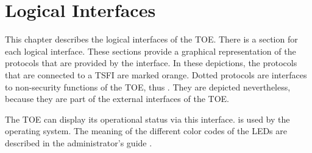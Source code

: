 \chapter{Logical Interfaces}\hypertarget{tsfi.ls}{\label{tsfi.ls}}

This chapter describes the logical interfaces of the TOE. There is a section for
each logical interface. These sections provide a graphical representation of the
protocols that are provided by the interface. In these depictions, the protocols
that are connected to a TSFI are marked orange. Dotted protocols are interfaces
to non-security functions of the TOE, thus . They are depicted
nevertheless, because they are part of the external interfaces of the TOE.

\clearpage



\clearpage



\clearpage



The TOE can display its operational status via this interface. \lsled{} is used
by the operating system. The meaning of the different color codes of the LEDs
are described in the administrator's guide \autocite[Section~6]{agd_adm}.


